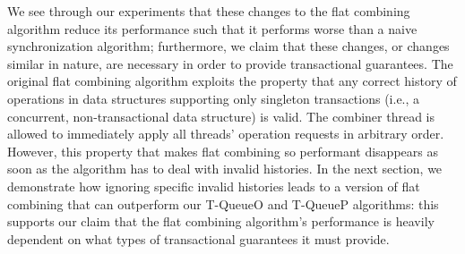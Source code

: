We see through our experiments that these changes to the flat combining algorithm reduce its performance such that it performs worse than a naive synchronization algorithm; furthermore, we claim that these changes, or changes similar in nature, are necessary in order to provide transactional guarantees. The original flat combining algorithm exploits the property that any correct history of operations in data structures supporting only singleton transactions (i.e., a concurrent, non-transactional data structure) is valid. The combiner thread is allowed to immediately apply all threads' operation requests in arbitrary order. However, this property that makes flat combining so performant disappears as soon as the algorithm has to deal with invalid histories. In the next section, we demonstrate how ignoring specific invalid histories leads to a version of flat combining that can outperform our T-QueueO and T-QueueP algorithms: this supports our claim that the flat combining algorithm's performance is heavily dependent on what types of transactional guarantees it must provide.
